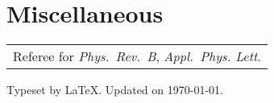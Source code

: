 \documentclass[a4paper, 11pt, DIV=15,headings=normal]{scrartcl}
\begin{document}
\section*{Miscellaneous}
\begin{tabular}{l}
Referee for \textit{Phys.\ Rev.\ B}, \textit{Appl.\ Phys. Lett}.
\end{tabular}

\begin{refsection}[cv.bib]
\nocite{*}
\printbibliography[resetnumbers=true, title={Publications (chronological order)}]
\end{refsection}

\vspace{6mm}

\begin{minipage}{0.4\linewidth}
\scriptsize Typeset by \LaTeX. Updated on \today.
\end{minipage}
\end{document}
